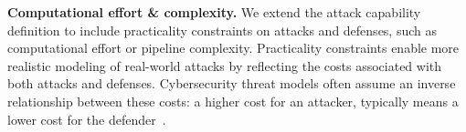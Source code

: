 \textbf{Computational effort \& complexity.} We extend the attack capability definition to include practicality constraints on attacks and defenses, such as computational effort or pipeline complexity. Practicality constraints enable more realistic modeling of real-world attacks by reflecting the costs associated with both attacks and defenses. Cybersecurity threat models often assume an inverse relationship between these costs: a higher cost for an attacker, typically means a lower cost for the defender~\cite{barreno_security_2010}.




